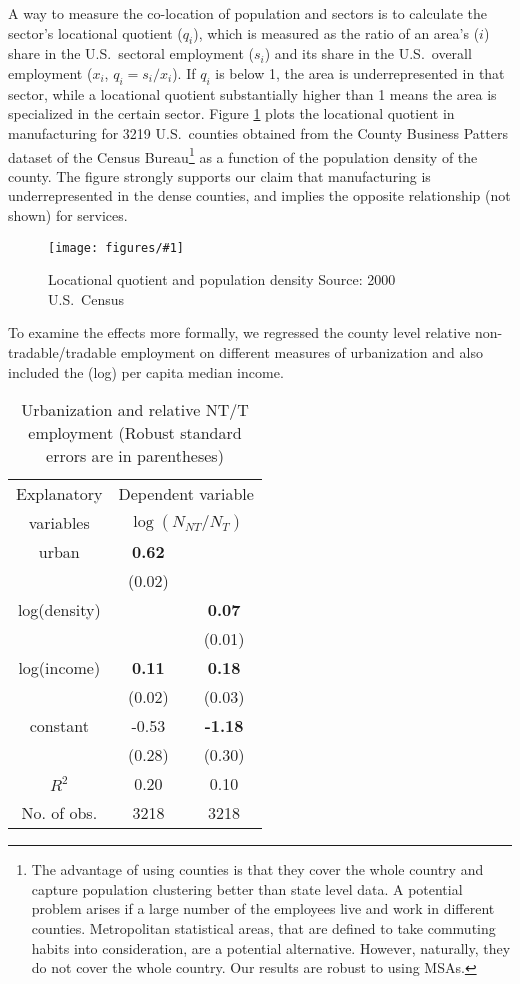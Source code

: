 \documentclass[12pt]{article}
\newcommand{\dofigure}[2]{\begin{figure}
\begin{centering}
\texttt{[image: figures/\#1]}
  \caption{#2\label{fig:#1}}
\end{centering}
\end{figure}}
\begin{document}
A way to measure the co-location of population and sectors is to calculate the sector's locational quotient ($q_i$), which is measured as the ratio of an area's ($i$) share in the U.S.~sectoral employment ($s_i$) and its share in the U.S.~overall employment ($x_i$, $q_i=s_i/x_i$). If $q_i$ is below 1, the area is underrepresented in that sector, while a locational quotient substantially higher than 1 means the area is specialized in the certain sector. Figure \ref{fig:LQ_scatter} plots the locational quotient in manufacturing for 3219 U.S.~counties obtained from the County Business Patters dataset of the Census Bureau\footnote{The advantage of using counties is that they cover the whole country and capture population clustering better than state level data. A potential problem arises if a large number of the employees live and work in different counties. Metropolitan statistical areas, that are defined to take commuting habits into consideration, are a potential alternative. However, naturally, they do not cover the whole country. Our results are robust to using MSAs.} as a function of the population density of the county. The figure strongly supports our claim that manufacturing is underrepresented in the dense counties, and implies the opposite relationship (not shown) for services.

\dofigure{LQ_scatter}{Locational quotient and population density\newline
 \small Source: 2000 U.S.~Census}

To examine the effects more formally, we regressed the county level relative non-tradable/tradable employment on different measures of urbanization and also included the (log) per capita median income.

\begin{table}[h!]
\center \caption{Urbanization and relative NT/T employment (Robust
standard errors are in parentheses)}
\begin{tabular}{c|cc}
  \hline\hline
  Explanatory & \multicolumn{2}{c}{Dependent variable} \\
  variables & \multicolumn{2}{c}{$\log (N_{NT}/N_T)$} \\ \hline
  urban         & \textbf{0.62} &  \\
                & (0.02)        &  \\
  log(density)  &               & \textbf{0.07} \\
                &               & (0.01) \\
  log(income)   & \textbf{0.11} & \textbf{0.18} \\
                & (0.02)        & (0.03) \\
  constant      & -0.53         & \textbf{-1.18} \\
                & (0.28)        & (0.30) \\ \hline
  $R^2$         & 0.20          & 0.10 \\
  No. of obs.   & 3218          & 3218 \\ \hline\hline
\end{tabular}
\end{table}
\end{document}
